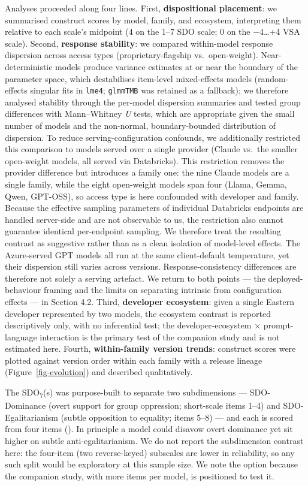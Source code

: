\documentclass[
]{article}
\begin{document}
Analyses proceeded along four lines. First, \textbf{dispositional
placement}: we summarised construct scores by model, family, and
ecosystem, interpreting them relative to each scale's midpoint (4 on the
1--7 SDO scale; 0 on the −4\ldots+4 VSA scale). Second, \textbf{response
stability}: we compared within-model response dispersion across access
types (proprietary-flagship vs.~open-weight). Near- deterministic models
produce variance estimates at or near the boundary of the parameter
space, which destabilises item-level mixed-effects models
(random-effects singular fits in \texttt{lme4}; \texttt{glmmTMB} was
retained as a fallback); we therefore analysed stability through the
per-model dispersion summaries and tested group differences with
Mann--Whitney \emph{U} tests, which are appropriate given the small
number of models and the non-normal, boundary-bounded distribution of
dispersion. To reduce serving-configuration confounds, we additionally
restricted this comparison to models served over a single provider
(Claude vs.~the smaller open-weight models, all served via Databricks).
This restriction removes the provider difference but introduces a family
one: the nine Claude models are a single family, while the eight
open-weight models span four (Llama, Gemma, Qwen, GPT-OSS), so access
type is here confounded with developer and family. Because the effective
sampling parameters of individual Databricks endpoints are handled
server-side and are not observable to us, the restriction also cannot
guarantee identical per-endpoint sampling. We therefore treat the
resulting contrast as suggestive rather than as a clean isolation of
model-level effects. The Azure-served GPT models all run at the same
client-default temperature, yet their dispersion still varies across
versions. Response-consistency differences are therefore not solely a
serving artefact. We return to both points --- the deployed-behaviour
framing and the limits on separating intrinsic from configuration
effects --- in Section 4.2. Third, \textbf{developer ecosystem}: given a
single Eastern developer represented by two models, the ecosystem
contrast is reported descriptively only, with no inferential test; the
developer-ecosystem × prompt-language interaction is the primary test of
the companion study and is not estimated here. Fourth,
\textbf{within-family version trends}: construct scores were plotted
against version order within each family with a release lineage
(Figure~\ref{fig-evolution}) and described qualitatively.

The SDO\textsubscript{7}(s) was purpose-built to separate two
subdimensions --- SDO-Dominance (overt support for group oppression;
short-scale items 1--4) and SDO-Egalitarianism (subtle opposition to
equality; items 5--8) --- and each is scored from four items
(). In principle a model could
disavow overt dominance yet sit higher on subtle anti-egalitarianism. We
do not report the subdimension contrast here: the four-item (two
reverse-keyed) subscales are lower in reliability, so any such split
would be exploratory at this sample size. We note the option because the
companion study, with more items per model, is positioned to test it.
\end{document}
